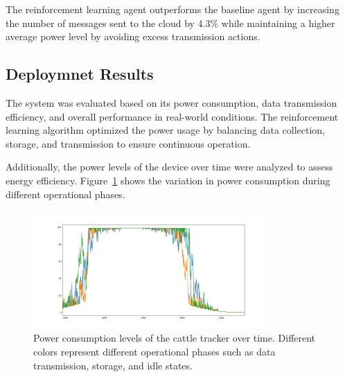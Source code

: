 \documentclass[10pt]{cai}
\begin{document}
The reinforcement learning agent outperforms the baseline agent by increasing the number of messages sent to the cloud by 4.3\% while maintaining a higher average power level by avoiding excess transmission actions.

\subsection{Deploymnet Results}





The system was evaluated based on its power consumption, data transmission efficiency, and overall performance in real-world conditions. 
The reinforcement learning algorithm optimized the power usage by balancing data collection, storage, and transmission to ensure continuous operation.

Additionally, the power levels of the device over time were analyzed to assess energy efficiency. Figure~\ref{fig:power_levels} shows the variation in power consumption during different operational phases.

\begin{figure}[htbp]
    \centering
    \includegraphics[width=0.8\textwidth]{./figs/power_levels.png}
    \caption{Power consumption levels of the cattle tracker over time. Different colors represent different operational phases such as data transmission, storage, and idle states.}
    \label{fig:power_levels}
\end{figure}
\end{document}

